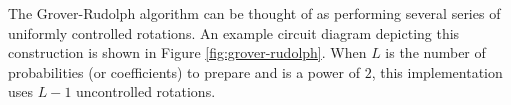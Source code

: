 \begin{figure*}
    
    \caption{
        \textbf{Grover-Rudolph Circuit Compilation.} 
        An implementation of the Grover-Rudolph algorithm using several series of uniformly controlled rotations is shown when $L = 8$.
        This circuit requires $L - 1$ rotations when $L$ is a power of $2$ and the angles of the rotations are changed ($\theta_i \rightarrow \alpha_i$) based on classical preprocessing.
    }
    \label{fig:grover-rudolph}
\end{figure*}


The Grover-Rudolph algorithm can be thought of as performing several series of uniformly controlled rotations.
An example circuit diagram depicting this construction is shown in Figure \ref{fig:grover-rudolph}.
When $L$ is the number of probabilities (or coefficients) to prepare and is a power of $2$, this implementation uses $L-1$ uncontrolled rotations.
